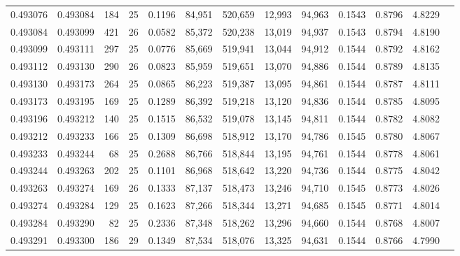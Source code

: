 \begin{tabular}{rrrrrrrrrrrrr}
0.493076 & 0.493084 & 184 &  25 &                                     0.1196 &  84,951 & 520,659 &  12,993 &  94,963 & 0.1543 & 0.8796 & 4.8229 \\
0.493084 & 0.493099 & 421 &  26 &                                     0.0582 &  85,372 & 520,238 &  13,019 &  94,937 & 0.1543 & 0.8794 & 4.8190 \\
0.493099 & 0.493111 & 297 &  25 &                                     0.0776 &  85,669 & 519,941 &  13,044 &  94,912 & 0.1544 & 0.8792 & 4.8162 \\
0.493112 & 0.493130 & 290 &  26 &                                     0.0823 &  85,959 & 519,651 &  13,070 &  94,886 & 0.1544 & 0.8789 & 4.8135 \\
0.493130 & 0.493173 & 264 &  25 &                                     0.0865 &  86,223 & 519,387 &  13,095 &  94,861 & 0.1544 & 0.8787 & 4.8111 \\
0.493173 & 0.493195 & 169 &  25 &                                     0.1289 &  86,392 & 519,218 &  13,120 &  94,836 & 0.1544 & 0.8785 & 4.8095 \\
0.493196 & 0.493212 & 140 &  25 &                                     0.1515 &  86,532 & 519,078 &  13,145 &  94,811 & 0.1544 & 0.8782 & 4.8082 \\
0.493212 & 0.493233 & 166 &  25 &                                     0.1309 &  86,698 & 518,912 &  13,170 &  94,786 & 0.1545 & 0.8780 & 4.8067 \\
0.493233 & 0.493244 &  68 &  25 &                                     0.2688 &  86,766 & 518,844 &  13,195 &  94,761 & 0.1544 & 0.8778 & 4.8061 \\
0.493244 & 0.493263 & 202 &  25 &                                     0.1101 &  86,968 & 518,642 &  13,220 &  94,736 & 0.1544 & 0.8775 & 4.8042 \\
0.493263 & 0.493274 & 169 &  26 &                                     0.1333 &  87,137 & 518,473 &  13,246 &  94,710 & 0.1545 & 0.8773 & 4.8026 \\
0.493274 & 0.493284 & 129 &  25 &                                     0.1623 &  87,266 & 518,344 &  13,271 &  94,685 & 0.1545 & 0.8771 & 4.8014 \\
0.493284 & 0.493290 &  82 &  25 &                                     0.2336 &  87,348 & 518,262 &  13,296 &  94,660 & 0.1544 & 0.8768 & 4.8007 \\
0.493291 & 0.493300 & 186 &  29 &                                     0.1349 &  87,534 & 518,076 &  13,325 &  94,631 & 0.1544 & 0.8766 & 4.7990 \\

\end{tabular}
